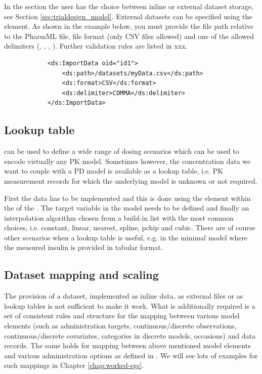 In the  section the user has the choice between inline or
external dataset storage, see Section \ref{sec:trialdesign_model}.
External datasets can be specified using the  element. 
As shown in the example below, you must provide the file path relative to the PharmML file, 
file format (only CSV files allowed) and one of the allowed delimiters (, 
, , ). Further validation rules are listed in xxx.

\lstset{language=XML}
\begin{lstlisting}
            <ds:ImportData oid="id1">
                <ds:path>/datasets/myData.csv</ds:path>
                <ds:format>CSV</ds:format>
                <ds:delimiter>COMMA</ds:delimiter>
            </ds:ImportData>
\end{lstlisting}



\subsection{Lookup table}
\label{subsec:lookupTable}

 can be used to define a wide range of dosing scenarios 
which can be used to encode virtually any PK model. Sometimes however, 
the concentration data we want to couple with a PD model is available as a 
lookup table, i.e. PK measurement records for which the underlying model 
is unknown or not required.

First the data has to be implemented and this is done using the 
element within the  of the . The target variable 
in the model needs to be defined and finally an interpolation algorithm chosen 
from a build-in list with the most common choices, i.e. constant, linear, nearest, 
spline, pchip and cubic. There are of course other scenarios when a lookup table is 
useful, e.g. in the minimal model where the measured insulin is provided in tabular
format.


\subsection{Dataset mapping and scaling}
\label{subsec:lookupTable}

The provision of a dataset, implemented as inline data, as external files or 
as lookup tables is not sufficient to make it work. What is additionally required 
is a set of consistent rules and structure for the mapping between 
various model elements (such as administration targets, continuous/discrete 
observations, continuous/discrete covariates, categories in discrete models, 
occasions) and data records. The same holds for mapping between above 
mentioned model elements and various administration options as defined 
in . We will see lots of examples for such mappings in 
Chapter \ref{chap:worked-egs}.


